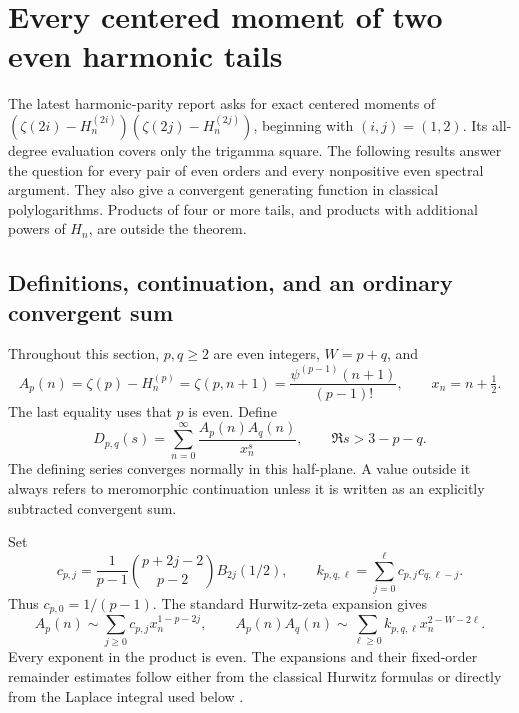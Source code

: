 \documentclass[11pt,a4paper]{article}
\numberwithin{equation}{section}
\theoremstyle{definition}
\theoremstyle{remark}
\begin{document}


\section{Every centered moment of two even harmonic tails}
\label{tail:section}

The latest harmonic-parity report asks for exact centered moments of
\((\zeta(2i)-H_n^{(2i)})(\zeta(2j)-H_n^{(2j)})\), beginning with
\((i,j)=(1,2)\). Its all-degree evaluation covers only the trigamma
square. The following results answer the question for every pair of
even orders and every nonpositive even spectral argument. They also
give a convergent generating function in classical polylogarithms.
Products of four or more tails, and products with additional powers
of \(H_n\), are outside the theorem.

\subsection{Definitions, continuation, and an ordinary convergent sum}

Throughout this section, \(p,q\ge2\) are even integers, \(W=p+q\), and
\[
 A_p(n)=\zeta(p)-H_n^{(p)}=\zeta(p,n+1)
       =\frac{\psi^{(p-1)}(n+1)}{(p-1)!},
 \qquad x_n=n+\tfrac12.
\]
The last equality uses that \(p\) is even. Define
\begin{equation}\label{tail:D}
 D_{p,q}(s)=\sum_{n=0}^{\infty}\frac{A_p(n)A_q(n)}{x_n^s},
 \qquad \Re s>3-p-q.
\end{equation}
The defining series converges normally in this half-plane. A value
outside it always refers to meromorphic continuation unless it is
written as an explicitly subtracted convergent sum.

Set
\begin{equation}\label{tail:asymptotic-coefficients}
 c_{p,j}=\frac1{p-1}\binom{p+2j-2}{p-2}B_{2j}(1/2),
 \qquad
 k_{p,q,\ell}=\sum_{j=0}^{\ell}c_{p,j}c_{q,\ell-j}.
\end{equation}
Thus \(c_{p,0}=1/(p-1)\). The standard Hurwitz-zeta expansion gives
\begin{equation}\label{tail:centered-expansion}
 A_p(n)\sim\sum_{j\ge0}c_{p,j}x_n^{1-p-2j},
 \qquad
 A_p(n)A_q(n)\sim\sum_{\ell\ge0}
                  k_{p,q,\ell}x_n^{2-W-2\ell}.
\end{equation}
Every exponent in the product is even. The expansions and their
fixed-order remainder estimates follow either from the classical
Hurwitz formulas or directly from the Laplace integral used below
\cite{DLMF}.
\end{document}

